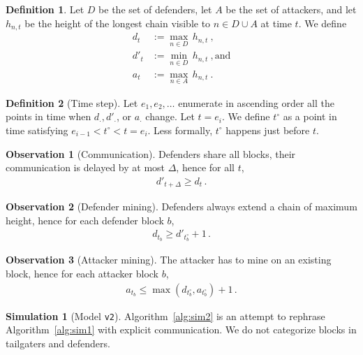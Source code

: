 \documentclass[12pt]{article}
\theoremstyle{definition}
\newtheorem{definition}{Definition}
\newtheorem{observation}{Observation}
\newtheorem{simulation}{Simulation}
\begin{document}
\begin{definition} \label{def:ts}
  Let $D$ be the set of defenders,
  let $A$ be the set of attackers, and
  let $h_{n,t}$ be the height of the longest chain visible to $n \in D \cup A$ at time $t$.
  We define
  \begin{align}
    d_t & := \max_{n \in D} \, h_{n, t} ~,\\
    d'_t & := \min_{n \in D} \, h_{n, t} ~, \text{and}\\
    a_t & := \max_{n \in A} \, h_{n, t} ~.
  \end{align}
\end{definition}

\newcommand{\justbefore}[1]{{#1^{\circ}}}

\begin{definition}[Time step]
  Let $e_1, e_2, \dots$ enumerate in ascending order all the points in time when $d_\cdot, d'_\cdot$, or $a_\cdot$ change.
  Let $t = e_i$. We define $\justbefore{t}$ as a point in time satisfying $e_{i-1} < \justbefore{t} < t =  e_i$.
  Less formally, $\justbefore{t}$ happens just before $t$.
\end{definition}

\begin{observation}[Communication] \label{obs:communication}
  Defenders share all blocks, their communication is delayed by at most $\Delta$, hence for all $t$,
  \begin{align}
    d'_{t + \Delta} \geq d_t \,.
  \end{align}
\end{observation}

\begin{observation}[Defender mining] \label{obs:defendermining}
  Defenders always extend a chain of maximum height, hence for each defender block $b$,
  \begin{align}
    d_{t_b} \geq d'_\justbefore{t_b} + 1\,.
  \end{align}
\end{observation}

\begin{observation}[Attacker mining] \label{obs:attackermining}
  The attacker has to mine on an existing block, hence for each attacker block $b$,
  \begin{align}
    a_{t_b} \leq \max\left(d_\justbefore{t_b}, a_\justbefore{t_{b}}\right) + 1\,.
  \end{align}
\end{observation}

\begin{simulation}[Model \texttt{v2}] \label{sim:v2}
  Algorithm~\ref{alg:sim2} is an attempt to rephrase Algorithm~\ref{alg:sim1} with explicit communication.
  We do not categorize blocks in tailgaters and defenders.
\end{simulation}
\end{document}
